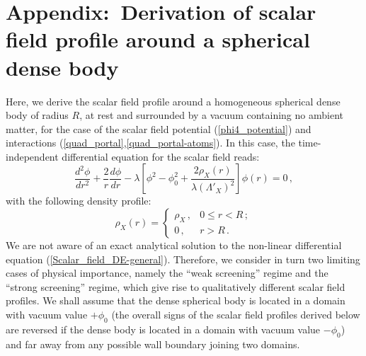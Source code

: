 \documentclass[aps,prd,onecolumn,nofootinbib]{revtex4-2} %
\begin{document}
\vspace{200mm}




\appendix
\section{Appendix:~Derivation of scalar field profile around a spherical dense body}
\label{Sec:Appendix}


Here, we derive the scalar field profile around a homogeneous spherical dense body of radius $R$, at rest and surrounded by a vacuum containing no ambient matter, for the case of the scalar field potential (\ref{phi4_potential}) and interactions (\ref{quad_portal},\ref{quad_portal-atoms}). 
In this case, the time-independent differential equation for the scalar field reads: 
\begin{equation}
\label{Scalar_field_DE-general}
\frac{d^2 \phi}{d r^2} + \frac{2}{r} \frac{d \phi}{d r} - \lambda \left[ \phi^2 - \phi_0^2 + \frac{2 \rho_X (r)}{\lambda \left( \Lambda'_X \right)^2} \right] \phi(r) = 0  \, , 
\end{equation}
with the following density profile: 
\begin{equation}
\label{density_profile}
\rho_X (r) = 
\left\{\begin{array}{ll}
\rho_X  \, , &  0\leq r < R  \, ; \\
0  \, , &  r > R \, . 
\end{array}\right.
\end{equation}
We are not aware of an exact analytical solution to the non-linear differential equation (\ref{Scalar_field_DE-general}). 
Therefore, we consider in turn two limiting cases of physical importance, namely the ``weak screening'' regime and the ``strong screening'' regime, which give rise to qualitatively different scalar field profiles. 
We shall assume that the dense spherical body is located in a domain with vacuum value $+\phi_0$ (the overall signs of the scalar field profiles derived below are reversed if the dense body is located in a domain with vacuum value $-\phi_0$) and far away from any possible wall boundary joining two domains. 




\end{document}
